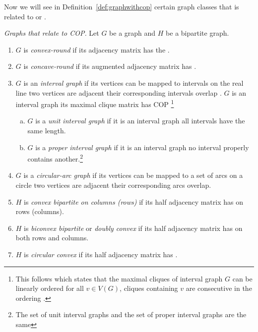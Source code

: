 \figgraphmatrices

Now we will see in Definition~\ref{def:graphwithcop} certain graph
classes that is related to \COP or \CROP.\\

\begin{definition}{\emph{Graphs that relate to
      COP.\cite[Def.~2.5]{d08phd}}} %
  \label{def:graphwithcop} %
  Let $G$ be a graph and $H$ be a bipartite graph.
  \begin{enumerate}
  \item $G$ is \emph{convex-round} if its adjacency matrix has the
    \CROP.
  \item \label{def::concave-round} $G$ is \emph{concave-round} if its
    augmented adjacency matrix has \CROP. 
  \item $G$ is an \emph{interval graph} if its vertices can be mapped
    to intervals on the real line \stt two vertices are adjacent \iff
    their corresponding intervals overlap .
    $G$ is an interval graph \iff its maximal clique matrix has COP
    \cite{fg65}\footnote{This follows \cite{gh64} which states that the
      maximal cliques of interval graph $G$ can be linearly ordered
      \stt for all $v \in V(G)$, cliques containing $v$ are
      consecutive in the ordering \cite[Th. 8.1]{mcg04}.}
    \begin{enumerate}[a.]
    \item $G$ is a \emph{unit interval graph} if it is an interval
      graph \stt all intervals have the same length.\footnotemark[2]
    \item $G$ is a \emph{proper interval graph} if it is an interval
      graph \stt no interval properly contains another.\footnote{The
        set of unit interval graphs and the set of proper interval
        graphs are the same} 
    \end{enumerate}
 \item $G$ is a \emph{circular-arc graph} if its vertices can be
    mapped to a set of arcs on a circle \stt two vertices are adjacent
    \iff their corresponding arcs overlap.
  \item $H$ is \emph{convex bipartite on columns (rows)} if its half
    adjacency matrix has \COP on rows (columns).%
    \label{def::convexbi}
  \item $H$ is \emph{biconvex bipartite} or \emph{doubly
      convex}\cite{yc95} if its half adjacency matrix has \COP on both
    rows and columns.
  \item $H$ is \emph{circular convex} if its half adjacency matrix has
    \CROP.
  \end{enumerate}
\end{definition}

